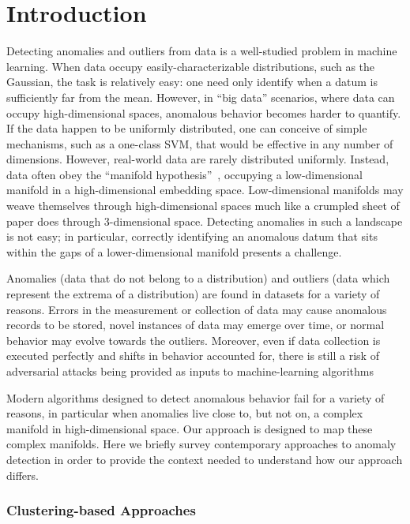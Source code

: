 \section{Introduction}
\label{sec:introduction}

Detecting anomalies and outliers from data is a well-studied problem in machine learning.
When data occupy easily-characterizable distributions, such as the Gaussian, the task is relatively easy: one need only identify when a datum is sufficiently far from the mean.
However, in ``big data'' scenarios, where data can occupy high-dimensional spaces, anomalous behavior becomes harder to quantify.
If the data happen to be uniformly distributed, one can conceive of simple mechanisms, such as a one-class SVM, that would be effective in any number of dimensions.
However, real-world data are rarely distributed uniformly.
Instead, data often obey the ``manifold hypothesis''~\cite{fefferman2016testing}, occupying a low-dimensional manifold in a high-dimensional embedding space.
Low-dimensional manifolds may weave themselves through high-dimensional spaces much like a crumpled sheet of paper does through 3-dimensional space.
Detecting anomalies in such a landscape is not easy;
in particular, correctly identifying an anomalous datum that sits within the gaps of a lower-dimensional manifold presents a challenge.

Anomalies (data that do not belong to a distribution) and outliers (data which represent the extrema of a distribution) are found in datasets for a variety of reasons.
Errors in the measurement or collection of data may cause anomalous records to be stored,
novel instances of data may emerge over time,
or normal behavior may evolve towards the outliers.
Moreover, even if data collection is executed perfectly and shifts in behavior accounted for, there is still a risk of adversarial attacks being provided as inputs to machine-learning algorithms~\cite{elsayed2018adversarial}

Modern algorithms designed to detect anomalous behavior fail for a variety of reasons, in particular when anomalies live close to, but not on, a complex manifold in high-dimensional space.
Our approach is designed to map these complex manifolds.
Here we briefly survey contemporary approaches to anomaly detection in order to provide the context needed to understand how our approach differs.

\subsubsection{Clustering-based Approaches}
\label{subsec:introduction:clustering-based-approaches}

